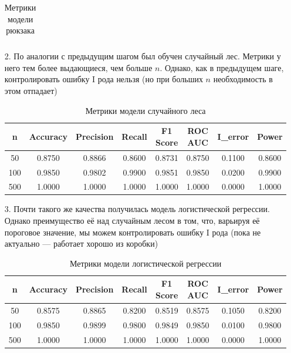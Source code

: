 \documentclass[a4paper,12pt]{article}
\begin{document}
\begin{itemize}
\begin{table}
\begin{tabular}{|c|c|c|c|c|c|c|c|}
    \end{tabular}
    \caption*{Метрики модели рюкзака}
    \label{tab:my_label}
\end{table}
\newpage
    \item[2.] По аналогии с предыдущим шагом был обучен случайный лес. Метрики у него тем более выдающиеся, чем больше $n$. Однако, как в предыдущем шаге, контролировать ошибку I рода нельзя (но при больших $n$ необходимость в этом отпадает) \\
    \begin{table}[H]
        \centering
        \begin{tabular}{|c|c|c|c|c|c|c|c|}
            \hline
            n & Accuracy & Precision & Recall & F1 Score & ROC AUC & I\_error & Power \\
            \hline
            50 & 0.8750 & 0.8866 & 0.8600 & 0.8731 & 0.8750 & 0.1100 & 0.8600 \\
            100 & 0.9850 & 0.9802 & 0.9900 & 0.9851 & 0.9850 & 0.0200 & 0.9900 \\
            500 & 1.0000 & 1.0000 & 1.0000 & 1.0000 & 1.0000 & 0.0000 & 1.0000 \\
            \hline
        \end{tabular}
        \caption*{Метрики модели случайного леса}
        \label{tab:random_forest_metrics}
    \end{table}
    \item[3.] Почти такого же качества получилась модель логистической регрессии. Однако преимущество её над случайным лесом в том, что, варьируя её пороговое значение, мы можем контролировать ошибку I рода (пока не актуально --- работает хорошо из коробки)
    \begin{table}[H]
    \centering
    \begin{tabular}{|c|c|c|c|c|c|c|c|}
        \hline
        n & Accuracy & Precision & Recall & F1 Score & ROC AUC & I\_error & Power \\
        \hline
        50 & 0.8575 & 0.8865 & 0.8200 & 0.8519 & 0.8575 & 0.1050 & 0.8200 \\
        100 & 0.9850 & 0.9899 & 0.9800 & 0.9849 & 0.9850 & 0.0100 & 0.9800 \\
        500 & 1.0000 & 1.0000 & 1.0000 & 1.0000 & 1.0000 & 0.0000 & 1.0000 \\
        \hline
    \end{tabular}
    \caption*{Метрики модели логистической регрессии}
    \label{tab:logistic_regression_metrics}
\end{table}
\end{itemize}
\end{document}
